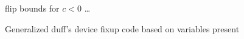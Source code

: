 \begin{figure}[H]
    \begin{algorithmic}
             \Comment flip bounds for $c < 0$
                \State {}
            \EndCase
                \State {}
            \EndCase
            \State \ldots
                \State {}
            \EndCase
        \EndSwitch
    \end{algorithmic}
    \caption{Generalized duff's device fixup code based on variables present}
    \label{fig:impl:fixup:duff:fixup-bound}
\end{figure}